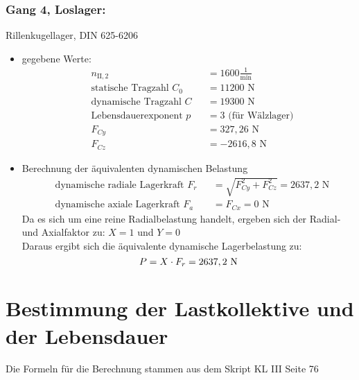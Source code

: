 \subsubsection{Gang 4, Loslager:} Rillenkugellager, DIN 625-6206\\
\begin{itemize}
	\item gegebene Werte:
	\begin{align*}
	&n_{{\mathord{\mathrm{II}},2}} &&=  1600 \frac{1}{\text{min}} \\
	&\text{statische Tragzahl } C_{0} &&= 11200 \text{ N}\\
	&\text{dynamische Tragzahl } C &&= 19300\text{ N} \\
	&\text{Lebensdauerexponent } p &&= 3 \text{ (für Wälzlager)} \\
	&F_{Cy} && = 327,26 \text{ N}\\
	&F_{Cz} && = -2616,8 \text{ N}
	\end{align*} 
	\item Berechnung der äquivalenten dynamischen Belastung
	\begin{align*}
	&\text{dynamische radiale Lagerkraft } F_r&& = \sqrt{F_{Cy}^2 + F_{Cz}^2 } =2637,2 \text{ N} \\
	&\text{dynamische axiale Lagerkraft } F_a&& = F_{Cx} = 0\text{ N}
	\end{align*} 
	Da es sich um eine reine Radialbelastung handelt, ergeben sich der Radial- und Axialfaktor zu: $X= 1$ und $Y=0$\\
	Daraus ergibt sich die äquivalente dynamische Lagerbelastung zu:  
	\[
	P= X \cdot F_r =2637,2\text{ N}
	\]
\end{itemize}
\newpage

\section{Bestimmung der Lastkollektive und der Lebensdauer}
Die Formeln für die Berechnung stammen aus dem Skript KL III Seite 76

